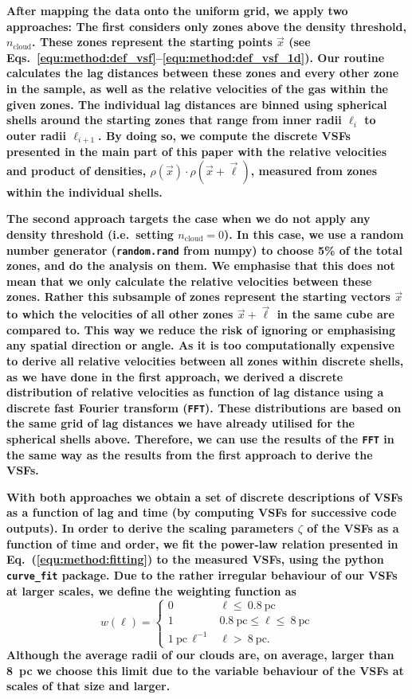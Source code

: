 \textbf{
After mapping the data onto the uniform grid, we apply two approaches: 
The first considers only zones above the density threshold, $n_\mathrm{cloud}$.
These zones represent the starting points $\vec{x}$ (see Eqs.~\ref{equ:method:def_vsf}--\ref{equ:method:def_vsf_1d}).
Our routine calculates the lag distances between these zones and every other zone in the sample, as well as the relative velocities of the gas within the given zones. 
The individual lag distances are binned using spherical shells around the starting zones that range from inner radii $\ell_{i}$ to outer radii $\ell_{i+1}$. 
By doing so, we compute the discrete VSFs presented in the main part of this paper with the relative velocities and product of densities, $\rho(\vec{x}) \cdot \rho(\vec{x}+\vec{\ell})$, measured from zones within the individual shells.
}

\textbf{
The second approach targets the case when we do not apply any density threshold (i.e.~setting $n_\mathrm{cloud} =0$).
In this case, we use a random number generator (\texttt{random.rand} from numpy) to choose 5\% of the total zones, and do the analysis on them.
We emphasise that this does not mean that we only calculate the relative velocities between these zones. Rather this subsample of zones represent the starting vectors $\vec{x}$ to which the velocities of all other zones $\vec{x} + \vec{\ell}$ in the same cube are compared to. This way we reduce the risk of ignoring or emphasising any spatial direction or angle.
As it is too computationally expensive to derive all relative velocities between all zones within discrete shells, as we have done in the first approach, we derived a discrete distribution of relative velocities as function of lag distance using a discrete fast Fourier transform (\texttt{FFT}). 
These distributions are based on the same grid of lag distances we have already utilised for the spherical shells above.
Therefore, we can use the results of the \texttt{FFT} in the same way as the results from the first approach to derive the VSFs.
}

\textbf{
With both approaches we obtain a set of discrete descriptions of VSFs as a function of  lag  and time (by computing VSFs for successive code outputs).
In order to derive the scaling parameters $\zeta$ of the VSFs as a function of time and order, we fit the power-law relation presented in Eq.~(\ref{equ:method:fitting}) to the measured VSFs, using the python \texttt{curve\_fit} package.
Due to the rather irregular behaviour of our VSFs at larger scales, we define the weighting function as
\begin{equation}
    w\left(\ell\right) = \begin{cases}
        0 & \ell \leq~\mathrm{0.8~pc} \\
        1 & \mathrm{0.8~pc} \leq \ell \leq~\mathrm{8~pc} \\
        \mathrm{1~pc}\,\ell^{-1} & \ell >~\mathrm{8~pc}.
    \end{cases}
\end{equation}
\noindent Although the average radii of our clouds are, on average, larger than 8~pc we choose this limit due to the variable behaviour of the VSFs at scales of that size and larger.
}

